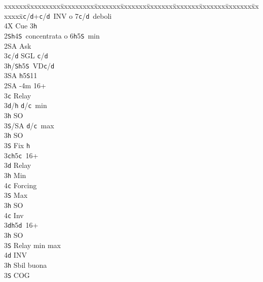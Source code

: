 \documentclass[a4paper,italian]{article}
\newcommand{\BS}{\small{\texttt{S}}}
\newcommand{\BC}{\small{\texttt{c}}}
\newcommand{\BD}{\small{\texttt{d}}}
\newcommand{\BH}{\small{\texttt{h}}}
\newenvironment{bidtable}
{\begin{tabbing}

    xxxxxx\=xxxxxxxxx\=xxxxxxxxx\=xxxxxxx\=xxxxxxx\=xxxxxxx\=xxxxxxx\=xxxxxxx\=xxxxxxx\=xxxxxxx\=\kill}
{\end{tabbing} }%
\begin{document}
\begin{multicols*}{2}
\begin{bidtable}
        3\BC/\BD {}+\BC/\BD\ INV o 7\BC/\BD\ deboli\\
        4X \> Cue 3\BH \-\\
        2\BS {}\BH 4\BS\ concentrata o 6\BH 5\BS\ min\+\\
        2\small{SA} \> Ask\+\\
        3\BC/\BD \> SGL \BC /\BD \\
        3\BH/\BS {}\BH 5\BS\ VD\BC /\BD \\
        3\small{SA} \BH 5\BS 11\-\-\\
        2\small{SA} -4m 16+\+\\
        3\BC \> Relay\+\\
        3\BD/\BH \> \BD /\BC\ min\+\\
        3\BH \> SO\-\\
        3\BS/SA \> \BD /\BC\ max\-\\
        3\BH \> SO\\
        3\BS \> Fix \BH\-\\
        3\BC {}\BH 5\BC\ 16+\+\\
        3\BD \> Relay\+\\
        3\BH \> Min\+\\
        4\BC \> Forcing\-\\
        3\BS \> Max\-\\
        3\BH \> SO\\
        4\BC \> Inv\-\\
        3\BD {}\BH 5\BD\ 16+\+\\
        3\BH \> SO\\
        3\BS \> Relay min max\\
        4\BD \> INV\-\\
        3\BH \> Sbil buona\+\\
        3\BS \> COG
    \end{bidtable}
\end{multicols*}
\newpage
\end{document}
